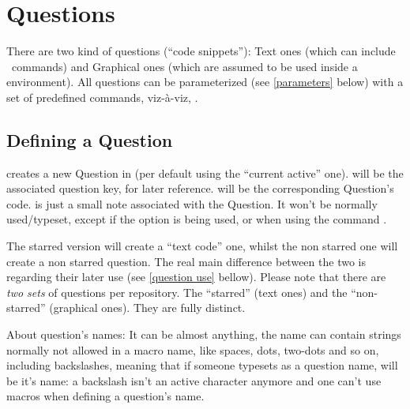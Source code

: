 \documentclass[10pt]{article}
\begin{document}
\section{Questions}
There are two kind of questions (``code snippets''): Text ones (which can include \LaTeXe\ commands) and Graphical ones (which are assumed to be used inside a  environment). All questions can be parameterized (see \ref{parameters} below) with a set of predefined commands, viz-à-viz, .

\subsection{Defining a Question}\label{question definition}
\begin{codedescribe}{}
\begin{codesyntax}%
\end{codesyntax}
 creates a new Question in  (per default using the ``current active'' one).  will be the associated question key, for later reference.  will be the corresponding Question's code.  is just a small note associated with the Question. It won't be normally used/typeset, except if the  option is being used, or when using the command \tsobj{\QuestionsList}.

The starred version  will create a ``text code'' one, whilst the non starred one  will create a non starred question. The real main difference between the two is regarding their later use (see \ref{question use}  bellow). Please note that there are \emph{two sets} of questions per repository. The ``starred'' (text ones) and the ``non-starred'' (graphical ones). They are fully distinct.
\end{codedescribe}

\begin{tsremark}
About question's names: It can be almost anything, the name can contain strings normally not allowed in a macro name, like spaces, dots, two-dots and so on, including backslashes, meaning that if someone typesets \tsobj{\XYZ} as a question name, \tsobj{\XYZ} will be it's name: a backslash isn't an active character anymore and one can't use macros when defining a question's name.
\end{tsremark}
\end{document}
